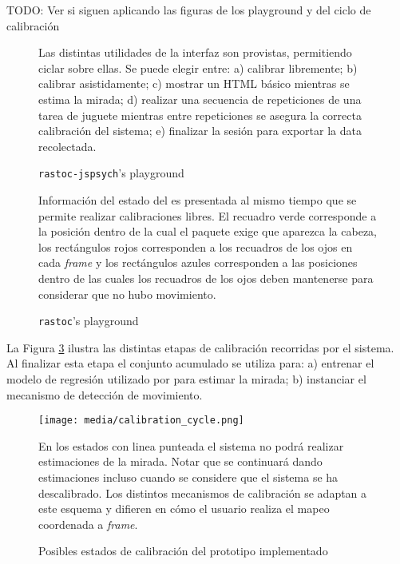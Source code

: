   TODO: Ver si siguen aplicando las figuras de los playground y del ciclo de calibración

  \begin{figure}
      \centering
      \caption{\texttt{rastoc-jspsych}’s playground}
      Las distintas utilidades de la interfaz \jspsych son provistas, permitiendo
      ciclar sobre ellas.
      Se puede elegir entre:
      a) calibrar libremente;
      b) calibrar asistidamente;
      c) mostrar un HTML básico mientras se estima la mirada;
      d) realizar una secuencia de repeticiones de una tarea de juguete mientras
      entre repeticiones se asegura la correcta calibración del sistema;
      e) finalizar la sesión para exportar la data recolectada.
      \label{fig:rastoc-jspsych-playground}
  \end{figure}

  \begin{figure}
      \centering
      \caption{\texttt{rastoc}’s playground}
      Información del estado del \eyetracker es presentada al mismo tiempo que se
      permite realizar calibraciones libres.
      El recuadro verde corresponde a la posición dentro de la cual el paquete
      \webgazer exige que aparezca la cabeza, los rectángulos rojos corresponden
      a los recuadros de los ojos en cada \textit{frame} y los rectángulos azules
      corresponden a las posiciones dentro de las cuales los recuadros de los
      ojos deben mantenerse para considerar que no hubo movimiento.
      \label{fig:rastoc-playground}
  \end{figure}

  La Figura \ref{fig:calibration_cycle} ilustra las distintas etapas de
  calibración recorridas por el sistema.
  Al finalizar esta etapa el conjunto acumulado se utiliza para: a) entrenar el
  modelo de regresión utilizado por \webgazer para estimar la mirada; b)
  instanciar el mecanismo de detección de movimiento.

  \begin{figure}
      \centering
      \texttt{[image: media/calibration\_cycle.png]}
      \caption{Posibles estados de calibración del prototipo implementado}
      En los estados con linea punteada el sistema no podrá realizar estimaciones
      de la mirada.
      Notar que se continuará dando estimaciones incluso cuando se considere que
      el sistema se ha descalibrado.
      Los distintos mecanismos de calibración se adaptan a este esquema y
      difieren en cómo el usuario realiza el mapeo coordenada a \textit{frame}.
      \label{fig:calibration_cycle}
  \end{figure}


